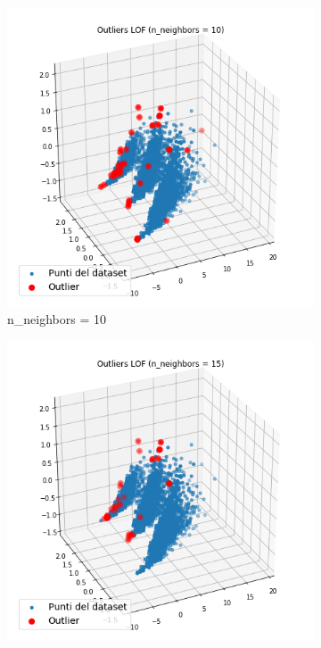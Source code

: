 \documentclass[a4paper]{article}
\begin{document}
\begin{figure}[h]
\centering
\begin{subfigure}[b]{.32\linewidth}
\includegraphics[width=\linewidth]{images/LOF_10.png}
\caption{n\_neighbors = 10}
\label{subfig:lof1}
\end{subfigure}
\begin{subfigure}[b]{.32\linewidth}
\includegraphics[width=\linewidth]{images/LOF_15.png}

\end{subfigure}
\end{figure}
\end{document}

